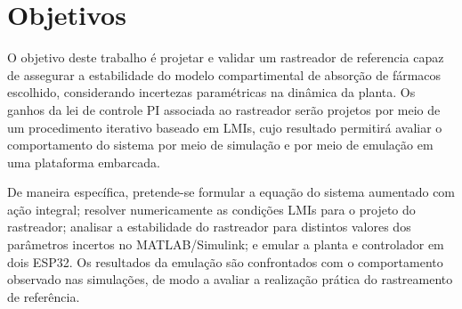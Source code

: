 \section{Objetivos}
\label{sec:objetivos}

O objetivo deste trabalho é projetar e validar um rastreador de referencia capaz de assegurar a estabilidade do modelo compartimental de absorção de fármacos escolhido, considerando incertezas paramétricas na dinâmica da planta. 
Os ganhos da lei de controle PI associada ao rastreador serão projetos por meio de um procedimento iterativo baseado em LMIs, cujo resultado permitirá avaliar o comportamento do sistema por meio de simulação e por meio de emulação em uma plataforma embarcada.

De maneira específica, pretende-se formular a equação do sistema aumentado com ação integral; resolver numericamente as condições LMIs para o projeto do rastreador; analisar a estabilidade do rastreador para distintos valores dos parâmetros incertos no MATLAB/Simulink; e emular a planta e controlador em dois ESP32. Os resultados da emulação são confrontados com o comportamento observado nas simulações, de modo a avaliar a realização prática do rastreamento de referência.

\newpage
